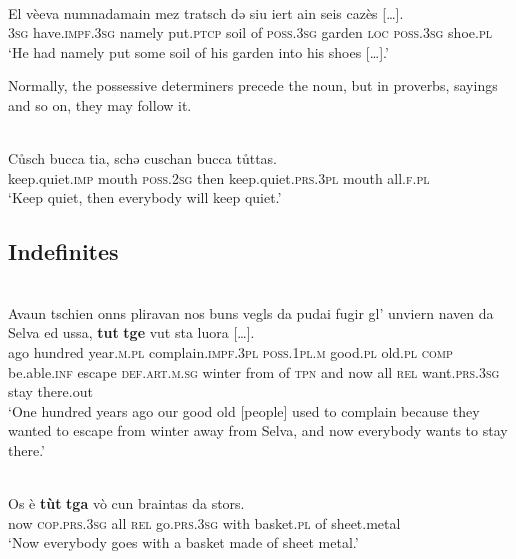 {\ea\label{}
\\
\gll    El vèeva numnadamain mez tratsch dǝ siu iert ain seis cazès […].\\
\textsc{3sg} have.\textsc{impf.3sg} namely put.\textsc{ptcp} soil of \textsc{poss.3sg} garden \textsc{loc} \textsc{poss.3sg} shoe.\textsc{pl}\\
\glt `He had namely put some soil of his garden into his shoes […].'
\z



Normally, the possessive determiners precede the noun, but in proverbs, sayings and so on, they may follow it.

\ea\label{}
\\
\gll Cůsch bucca tia, schǝ cuschan bucca tůttas.\\
     keep.quiet.\textsc{imp} mouth \textsc{poss.2sg} then keep.quiet.\textsc{prs.3pl} mouth all.\textsc{f.pl}\\
\glt `Keep quiet, then everybody will keep quiet.'
\z


\subsection{Indefinites}
\ea\label{ex:}
\\
\gll  Avaun tschien onns pliravan nos buns vegls da pudai fugir gl’ unviern naven da Selva ed ussa, \textbf{tut} \textbf{tge} vut sta luora […].  \\
     ago hundred year.\textsc{m.pl} complain.\textsc{impf.3pl} \textsc{poss.1pl.m} good.\textsc{pl} old.\textsc{pl} \textsc{comp} be.able.\textsc{inf} escape \textsc{def.art.m.sg} winter from of \textsc{tpn} and now all \textsc{rel} want.\textsc{prs.3sg} stay there.out \\
\glt `One hundred years ago our good old [people] used to complain because they wanted to escape from winter away from Selva, and now everybody wants to stay there.'
\z

\ea\label{}
\\
\gll  Os è \textbf{tùt} \textbf{tga} vò cun braintas da stors. \\
     now \textsc{cop.prs.3sg} all \textsc{rel} go.\textsc{prs.3sg} with basket.\textsc{pl} of sheet.metal\\
\glt `Now everybody goes with a basket made of sheet metal.'
\z

}
